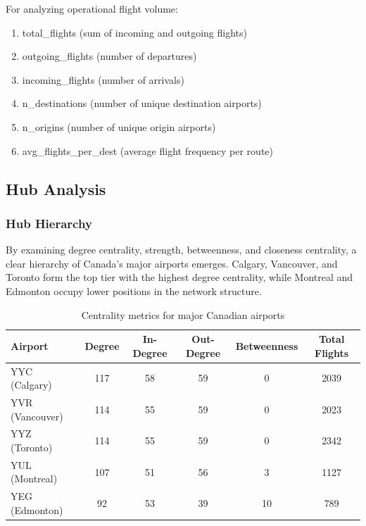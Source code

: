 \documentclass[9pt]{article}
\begin{document}
For analyzing operational flight volume:
\begin{enumerate}[label=\arabic*.]
    \item total\_flights (sum of incoming and outgoing flights)
    \item outgoing\_flights (number of departures)
    \item incoming\_flights (number of arrivals)
    \item n\_destinations (number of unique destination airports)
    \item n\_origins (number of unique origin airports)
    \item avg\_flights\_per\_dest (average flight frequency per route)
\end{enumerate}

\subsection{Hub Analysis}

\subsubsection{Hub Hierarchy}

By examining degree centrality, strength, betweenness, and closeness centrality, a clear hierarchy of Canada's major airports emerges. Calgary, Vancouver, and Toronto form the top tier with the highest degree centrality, while Montreal and Edmonton occupy lower positions in the network structure.

\begin{table}[h!]
    \centering
    \caption{Centrality metrics for major Canadian airports}
    \begin{tabular}{lccccc}
        \toprule
        Airport & Degree & In-Degree & Out-Degree & Betweenness & Total Flights \\
        \midrule
        YYC (Calgary)   & 117 & 58 & 59 & 0  & 2039 \\
        YVR (Vancouver) & 114 & 55 & 59 & 0  & 2023 \\
        YYZ (Toronto)   & 114 & 55 & 59 & 0  & 2342 \\
        YUL (Montreal)  & 107 & 51 & 56 & 3  & 1127 \\
        YEG (Edmonton)  & 92  & 53 & 39 & 10 & 789  \\
        \bottomrule
    \end{tabular}
\end{table}
\end{document}
